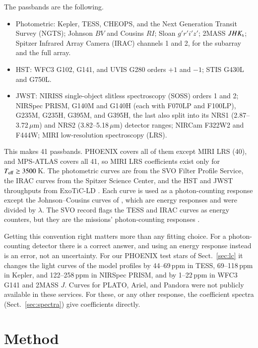 \documentclass{aa}
\newcommand{\ppm}{\,\textrm{ppm}}
\newcommand{\teff}{T_{\rm eff}}
\begin{document}
The passbands are the following.
\begin{itemize}
\item Photometric: Kepler, TESS, CHEOPS, and the Next Generation Transit Survey
(NGTS); Johnson $BV$ and Cousins
$RI$; Sloan $g'r'i'z'$; 2MASS $JHK_{\rm s}$; Spitzer Infrared Array Camera
(IRAC) channels 1 and 2, for the subarray and the full array.
\item HST: WFC3 G102, G141, and UVIS G280 orders $+1$ and $-1$; STIS G430L and
G750L.
\item JWST: NIRISS single-object slitless spectroscopy (SOSS) orders 1 and 2;
NIRSpec PRISM, G140M and G140H (each
with F070LP and F100LP), G235M, G235H, G395M, and G395H, the last also split
into its NRS1 (2.87--3.72\,$\mu$m) and NRS2 (3.82--5.18\,$\mu$m) detector
ranges; NIRCam F322W2 and F444W; MIRI low-resolution spectroscopy (LRS).
\end{itemize}
This makes 41 passbands. PHOENIX covers all of them except MIRI LRS (40), and
MPS-ATLAS covers all 41, so MIRI LRS coefficients exist only for
$\teff\ge3500$\,K.
The photometric curves are from the SVO Filter Profile Service, the IRAC curves
from the Spitzer Science Center, and the HST and JWST throughputs from
ExoTiC-LD \citep{grant2024}. Each curve is used as a photon-counting response
except the Johnson--Cousins curves of \citet{bessell1990}, which are energy
responses and were divided by $\lambda$. The SVO record flags the TESS and IRAC
curves as energy counters, but they are the missions' photon-counting
responses \citep{vanderspek2018,irachandbook}.

Getting this convention right matters more than any fitting choice. For a
photon-counting detector there is a correct answer, and using an energy
response instead is an error, not an uncertainty. For our PHOENIX test stars of
Sect.~\ref{sec:lc} it changes the light curves of the model profiles by
44--69\ppm{} in TESS, 69--118\ppm{} in Kepler, and 122--258\ppm{} in NIRSpec
PRISM, and by 1--22\ppm{} in WFC3 G141 and 2MASS $J$.
Curves for PLATO, Ariel, and Pandora were not publicly available in these
services. For these, or any other response, the coefficient spectra
(Sect.~\ref{sec:spectra}) give coefficients directly.

\section{Method}\label{sec:method}
\end{document}
